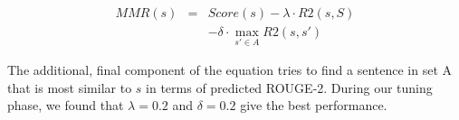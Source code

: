 \begin{eqnarray*}
MMR(s)  &=& Score(s) - \lambda \cdot R2(s, S) \\
        & & - \delta \cdot \max_{s' \in A}R2(s, s')
\end{eqnarray*}

The additional, final component of the equation tries to find a sentence in set A that is most similar to $s$ in terms of predicted ROUGE-2.
During our tuning phase, we found that $\lambda = 0.2$ and $\delta = 0.2$ give the best performance.
